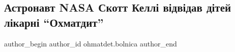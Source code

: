  
 
 
 
 
 
\subsection{Астронавт NASA Скотт Келлі відвідав дітей лікарні \enquote{Охматдит}}
\label{sec:28_11_2022.fb.ohmatdet.bolnica.1.astronavt}
 
\ifcmt
 author_begin
   author_id ohmatdet.bolnica
 author_end
\fi
